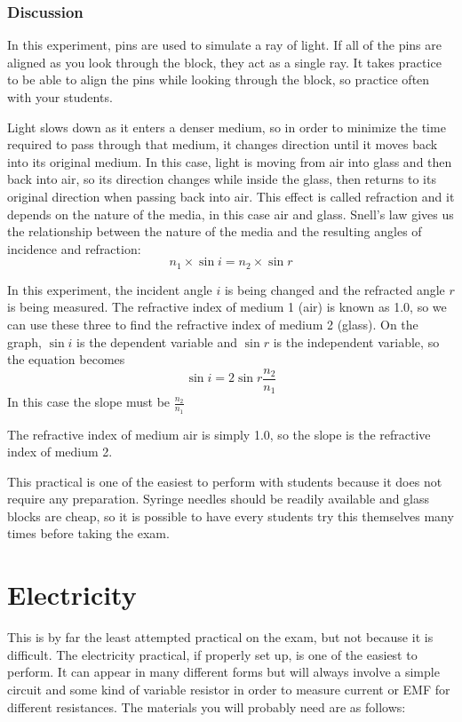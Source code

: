 \subsubsection{Discussion}

In this experiment, pins are used to simulate a ray of light. If all of the pins are
aligned as you look through the block, they act as a single ray. It takes practice to be able
to align the pins while looking through the block, so practice often with your students.

Light slows down as it enters a denser medium, so in order to minimize the time
required to pass through that medium, it changes direction until it moves back into its
original medium. In this case, light is moving from air into glass and then back into air,
so its direction changes while inside the glass, then returns to its original direction when
passing back into air. This effect is called refraction and it depends on the nature of the
media, in this case air and glass. Snell’s law gives us the relationship between the nature
of the media and the resulting angles of incidence and refraction:
$$n_1 \times \sin{i} = n_2 \times \sin{r}$$

In this experiment, the incident angle $i$ is being changed and the refracted angle $r$
is being measured. The refractive index of medium 1 (air) is known as 1.0, so we can use
these three to find the refractive index of medium 2 (glass). On the graph, $\sin{i}$ is the
dependent variable and $\sin{r}$ is the independent variable, so the equation becomes
$$\sin{i} = 2 \sin{r} \frac{n_2}{n_1}$$
In this case the slope must be $\frac{n_2}{n_1}$

The refractive index of medium air is simply 1.0, so the slope is the refractive index of
medium 2.

This practical is one of the easiest to perform with students because it does not
require any preparation. Syringe needles should be readily available and glass blocks are
cheap, so it is possible to have every students try this themselves many times before
taking the exam.

\section{Electricity}

This is by far the least attempted practical on the exam, but not because it is
difficult. The electricity practical, if properly set up, is one of the easiest to perform. It
can appear in many different forms but will always involve a simple circuit and some
kind of variable resistor in order to measure current or EMF for different resistances. The
materials you will probably need are as follows:

